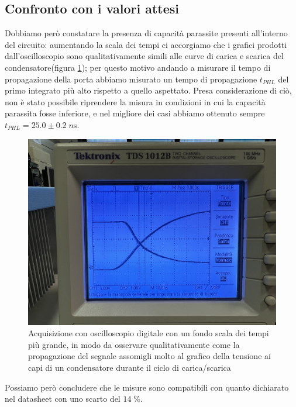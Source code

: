 \documentclass[10pt, a4paper, italian]{article}
\begin{document}
\subsection{Confronto con i valori attesi}
Dobbiamo però constatare la presenza di capacità parassite presenti all'interno del circuito: aumentando la scala dei tempi ci accorgiamo che i grafici prodotti dall'oscilloscopio sono qualitativamente simili alle curve di carica e scarica del condensatore(figura \cref{fig: carica}); per questo motivo andando a misurare il tempo di propagazione della porta abbiamo misurato un tempo di propagazione $t_{PHL}$ del primo integrato più alto rispetto a quello aspettato. Presa considerazione di ciò, non è stato possibile riprendere la misura in condizioni in cui la capacità parassita fosse inferiore, e nel migliore dei casi abbiamo ottenuto sempre $t_{PHL}=25.0 \pm 0.2 \; \si{n\s}$.
\begin{figure}[htbp]
\centering
	\includegraphics[width=\textwidth]{carica}
	
	\caption{\label{fig: carica}Acquisizione con oscilloscopio digitale con un fondo scala dei tempi più grande, in modo da osservare qualitativamente come la propagazione del segnale assomigli molto al grafico della tensione ai capi di un condensatore durante il ciclo di carica/scarica}
\end{figure}
Possiamo però concludere che le misure sono compatibili con quanto dichiarato nel datasheet con uno scarto del $14 \; \percent$.

\setcounter{section}{3}
\end{document}
